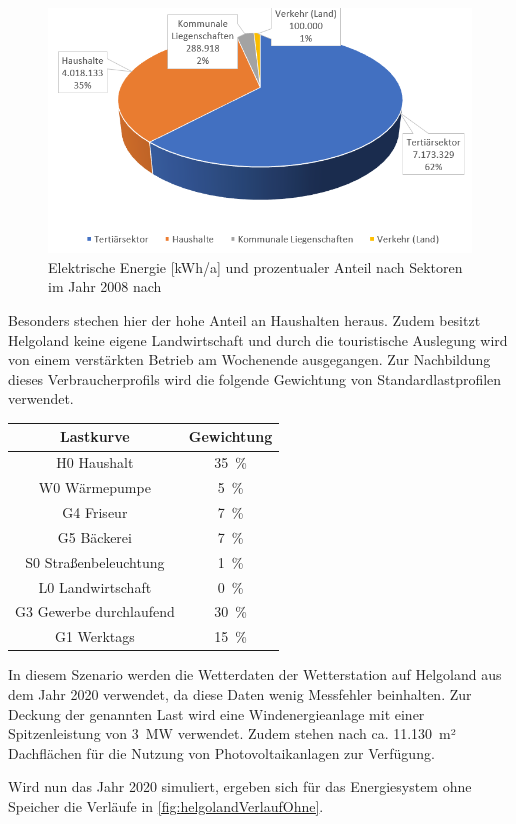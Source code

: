 \begin{figure}[H]
	\centering
	\includegraphics[width=0.6\linewidth]{Abbildungen/StromverbrauchHelgoland.png}
	\caption{Elektrische Energie [kWh/a] und prozentualer Anteil nach Sektoren im Jahr 2008 nach \cite{Helgoland}}
	\label{fig:helgolandVerbrauch}
\end{figure}

Besonders stechen hier der hohe Anteil an Haushalten heraus. Zudem besitzt Helgoland keine eigene Landwirtschaft und durch die touristische Auslegung wird von einem verstärkten Betrieb am Wochenende ausgegangen. Zur Nachbildung dieses Verbraucherprofils wird die folgende Gewichtung von Standardlastprofilen verwendet.

\begin{center}
	\begin{tabular}[htpb]{c|c}
		\textbf{Lastkurve} & \textbf{Gewichtung} \\
		\hline
		H0 Haushalt & 35~\% \\
		W0 Wärmepumpe & 5~\% \\
		G4 Friseur & 7~\% \\
		G5 Bäckerei & 7~\% \\
		S0 Straßenbeleuchtung & 1~\% \\
		L0 Landwirtschaft & 0~\% \\
		G3 Gewerbe durchlaufend & 30~\% \\
		G1 Werktags & 15~\% 
	\end{tabular}
\end{center}

In diesem Szenario werden die Wetterdaten der Wetterstation auf Helgoland aus dem Jahr 2020 verwendet, da diese Daten wenig Messfehler beinhalten. Zur Deckung der genannten Last wird eine Windenergieanlage mit einer Spitzenleistung von 3~MW verwendet. Zudem stehen nach \cite{Helgoland} ca. 11.130~m² Dachflächen für die Nutzung von Photovoltaikanlagen zur Verfügung. 

Wird nun das Jahr 2020 simuliert, ergeben sich für das Energiesystem ohne Speicher die Verläufe in \autoref{fig:helgolandVerlaufOhne}.

